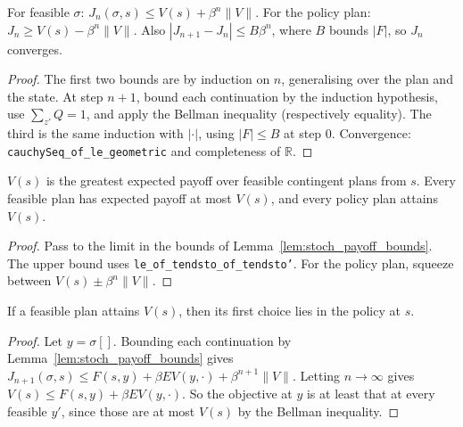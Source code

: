 \begin{lemma}[Bounds on $J_n$]
\label{lem:stoch_payoff_bounds}
\leanok
{}
For feasible $\sigma$: $J_n(\sigma, s) \le V(s) + \beta^n \|V\|$. For the policy plan:
$J_n \ge V(s) - \beta^n\|V\|$. Also $|J_{n+1} - J_n| \le B\beta^n$, where $B$ bounds $|F|$, so $J_n$ converges.
\end{lemma}
\begin{proof}
\leanok
The first two bounds are by induction on $n$, generalising over the plan and the state. At step $n+1$, bound
each continuation by the induction hypothesis, use $\sum_{z'} Q = 1$, and apply the Bellman inequality
(respectively equality). The third is the same induction with $|\cdot|$, using $|F| \le B$ at step $0$.
Convergence: \texttt{cauchySeq\_of\_le\_geometric} and completeness of $\mathbb R$.
\end{proof}

\begin{theorem}
\label{thm:stoch_isGreatest}
\leanok
{}
$V(s)$ is the greatest expected payoff over feasible contingent plans from $s$. Every feasible plan has
expected payoff at most $V(s)$, and every policy plan attains $V(s)$.
\end{theorem}
\begin{proof}
\leanok
Pass to the limit in the bounds of Lemma~\ref{lem:stoch_payoff_bounds}. The upper bound uses
\texttt{le\_of\_tendsto\_of\_tendsto'}. For the policy plan, squeeze between $V(s) \pm \beta^n\|V\|$.
\end{proof}

\begin{theorem}
\label{thm:stoch_policy_of_optimal}
\leanok
{}
If a feasible plan attains $V(s)$, then its first choice lies in the policy at $s$.
\end{theorem}
\begin{proof}
\leanok
Let $y = \sigma[]$. Bounding each continuation by Lemma~\ref{lem:stoch_payoff_bounds} gives
$J_{n+1}(\sigma, s) \le F(s,y) + \beta E V(y,\cdot) + \beta^{n+1}\|V\|$. Letting $n \to \infty$ gives
$V(s) \le F(s,y) + \beta E V(y,\cdot)$. So the objective at $y$ is at least that at every feasible $y'$, since
those are at most $V(s)$ by the Bellman inequality.
\end{proof}

